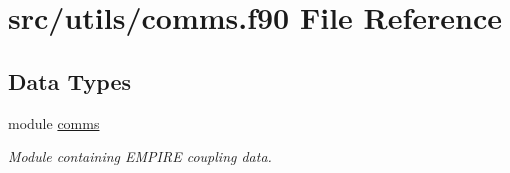 \hypertarget{comms_8f90}{\section{src/utils/comms.f90 File Reference}
\label{comms_8f90}
}
\subsection*{Data Types}
\begin{DoxyCompactItemize}
\item 
module \hyperlink{classcomms}{comms}
\begin{DoxyCompactList}\small\item\em Module containing E\-M\-P\-I\-R\-E coupling data. \end{DoxyCompactList}\end{DoxyCompactItemize}
